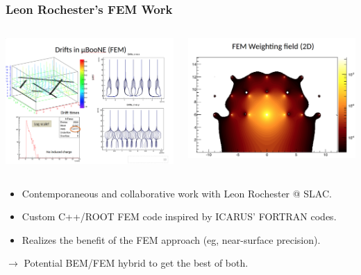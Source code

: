 \documentclass[xcolor=dvipsnames]{beamer}
\begin{document}
\begin{frame}
  \frametitle{Leon Rochester's FEM Work}
  \begin{columns}
    \begin{column}{0.5\textwidth}
      \begin{center}
        \includegraphics[width=\textwidth]{leon-drifts.png}
      \end{center}
    \end{column}
    \begin{column}{0.5\textwidth}
      \begin{center}
        \includegraphics[width=\textwidth]{leon-weighting.png}        
      \end{center}
    \end{column}
  \end{columns}
  \begin{itemize}\footnotesize
  \item Contemporaneous and collaborative work with Leon Rochester @ SLAC.
  \item Custom C++/ROOT FEM code inspired by ICARUS' FORTRAN codes.
  \item Realizes the benefit of the FEM approach (eg, near-surface precision).
  \end{itemize}
  $\rightarrow$ Potential BEM/FEM hybrid to get the best of both.
\end{frame}
\end{document}
